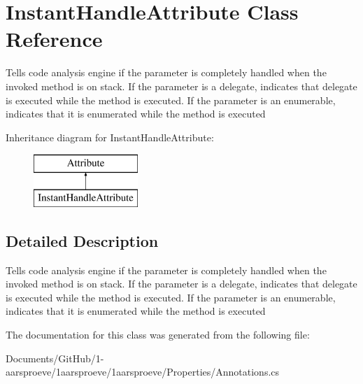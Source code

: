\hypertarget{class_instant_handle_attribute}{}\section{Instant\+Handle\+Attribute Class Reference}
\label{class_instant_handle_attribute}


Tells code analysis engine if the parameter is completely handled when the invoked method is on stack. If the parameter is a delegate, indicates that delegate is executed while the method is executed. If the parameter is an enumerable, indicates that it is enumerated while the method is executed  


Inheritance diagram for Instant\+Handle\+Attribute\+:\begin{figure}[H]
\begin{center}
\leavevmode
\includegraphics[height=2.000000cm]{class_instant_handle_attribute}
\end{center}
\end{figure}


\subsection{Detailed Description}
Tells code analysis engine if the parameter is completely handled when the invoked method is on stack. If the parameter is a delegate, indicates that delegate is executed while the method is executed. If the parameter is an enumerable, indicates that it is enumerated while the method is executed 



The documentation for this class was generated from the following file\+:\begin{DoxyCompactItemize}
\item 
Documents/\+Git\+Hub/1-\/aarsproeve/1aarsproeve/1aarsproeve/\+Properties/Annotations.\+cs\end{DoxyCompactItemize}
